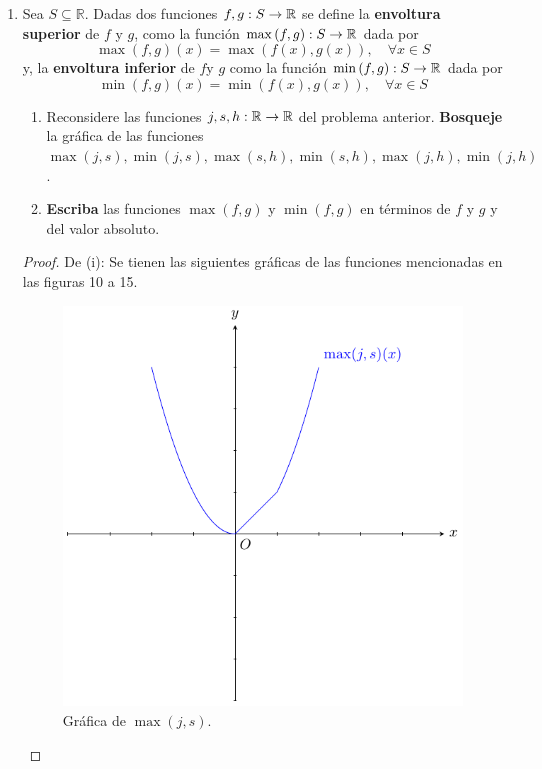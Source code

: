 \documentclass[12pt]{article}
\begin{document}
\begin{enumerate}
    \item Sea $S\subseteq\mathbb{R}$. Dadas dos funciones $f,g:S\rightarrow\mathbb{R}$ se define la \textbf{envoltura superior} de $f$ y $g$, como la función $\max\left(f,g\right):S\rightarrow\mathbb{R}$ dada por
    \begin{equation*}
        \max\left(f,g\right)(x)=\max\left(f(x),g(x)\right),\quad\forall x\in S
    \end{equation*}
    y, la \textbf{envoltura inferior} de $f$y $g$ como la función $\min\left(f,g\right):S\rightarrow\mathbb{R}$ dada por
    \begin{equation*}
        \min\left(f,g\right)(x)=\min\left(f(x),g(x)\right),\quad\forall x\in S
    \end{equation*}
    \begin{enumerate}
        \item Reconsidere las funciones $j,s,h:\mathbb{R}\rightarrow\mathbb{R}$ del problema anterior. \textbf{Bosqueje} la gráfica de las funciones $\max(j,s),\min(j,s),\max(s,h),\min(s,h),\max(j,h),\min(j,h)$.
        \item \textbf{Escriba} las funciones $\max(f,g)$ y $\min(f,g)$ en términos de $f$ y $g$ y del valor absoluto.
    \end{enumerate}

    \begin{proof}
        De (i): Se tienen las siguientes gráficas de las funciones mencionadas en las figuras 10 a 15.

        \begin{figure}
            \begin{center}
                \includegraphics[scale=1]{images/3_12_1.pdf}
            \end{center}
            \caption{Gráfica de $\max(j,s)$.}
        \end{figure}


\end{proof}
\end{enumerate}
\end{document}
